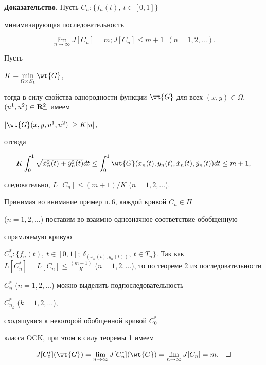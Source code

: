 {\bf Доказательство.} Пусть $C_n:\{f_n(t),\ t\in [0,1] \}$ ---


минимизирующая последовательность


$$


\lim_{n\to \infty }J[C_n]=m;J[C_n] \leq


m+1\ \; (n=1,2,\dotsc).


$$


Пусть


$K=\min\limits_{ \Omega \times S_1}\wt{G}$,


тогда в силу свойства однородности функции $\wt{G}$ для всех $(x,y)\in


\Omega$, $(u^1,u^2) \in {\bold R}^2_+ $ имеем


$|\wt{G}(x,y, u^1,u^2)| \geq K|u|$,


отсюда


$$


K \int_{0}^{1} \sqrt{\Dot{x}_n^2(t)+\Dot{y}_n^2(t)}dt


\leq \int_{0}^{1} \wt{G}(x_n(t),y_n(t),\Dot{x}_n(t),\Dot{y}_n(t))dt


\leq m+1,


$$


следовательно, $L[C_n] \leq (m+1)/K$ ($n=1,2,\dotsc$).





Принимая во внимание пример п.\,6, каждой кривой $C_n\in\Pi$


($n=1,2,\dotsc$) поставим во взаимно однозначное соответствие обобщенную


спрямляемую кривую


$C^*_n:\{f_n(t),\ t\in [0,1];\ \delta_{(\Dot{x}_n(t),\Dot{y}_n(t))},


\ t\in T_n\}$. Так как $L[C^*_n]=L[C_n] \leq


\frac{(m+1)}{K}$ ($n=1,2,\dotsc$), то по теореме 2 из последовательности


$C^*_n$ ($n=1,2,\dotsc$) можно выделить подпоследовательность


$C^*_{n_k}$ ($k=1,2,\dotsc$),


сходящуюся к некоторой обобщенной кривой $C^*_0$


класса OCK, при этом в силу теоремы 1 имеем


$$


J[C^*_0](\wt{G})=\lim_{n\to


\infty }J[C^*_n](\wt{G})= \lim_{n\to \infty }J[C_n]=m. \quad\square


$$





